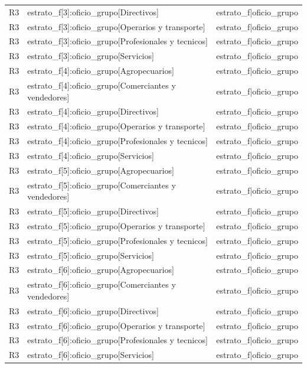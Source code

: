 \begin{longtable}{lll}
R3 & estrato\_f[3]:oficio\_grupo[Directivos] & estrato\_f|oficio\_grupo \\
R3 & estrato\_f[3]:oficio\_grupo[Operarios y transporte] & estrato\_f|oficio\_grupo \\
R3 & estrato\_f[3]:oficio\_grupo[Profesionales y tecnicos] & estrato\_f|oficio\_grupo \\
R3 & estrato\_f[3]:oficio\_grupo[Servicios] & estrato\_f|oficio\_grupo \\
R3 & estrato\_f[4]:oficio\_grupo[Agropecuarios] & estrato\_f|oficio\_grupo \\
R3 & estrato\_f[4]:oficio\_grupo[Comerciantes y vendedores] & estrato\_f|oficio\_grupo \\
R3 & estrato\_f[4]:oficio\_grupo[Directivos] & estrato\_f|oficio\_grupo \\
R3 & estrato\_f[4]:oficio\_grupo[Operarios y transporte] & estrato\_f|oficio\_grupo \\
R3 & estrato\_f[4]:oficio\_grupo[Profesionales y tecnicos] & estrato\_f|oficio\_grupo \\
R3 & estrato\_f[4]:oficio\_grupo[Servicios] & estrato\_f|oficio\_grupo \\
R3 & estrato\_f[5]:oficio\_grupo[Agropecuarios] & estrato\_f|oficio\_grupo \\
R3 & estrato\_f[5]:oficio\_grupo[Comerciantes y vendedores] & estrato\_f|oficio\_grupo \\
R3 & estrato\_f[5]:oficio\_grupo[Directivos] & estrato\_f|oficio\_grupo \\
R3 & estrato\_f[5]:oficio\_grupo[Operarios y transporte] & estrato\_f|oficio\_grupo \\
R3 & estrato\_f[5]:oficio\_grupo[Profesionales y tecnicos] & estrato\_f|oficio\_grupo \\
R3 & estrato\_f[5]:oficio\_grupo[Servicios] & estrato\_f|oficio\_grupo \\
R3 & estrato\_f[6]:oficio\_grupo[Agropecuarios] & estrato\_f|oficio\_grupo \\
R3 & estrato\_f[6]:oficio\_grupo[Comerciantes y vendedores] & estrato\_f|oficio\_grupo \\
R3 & estrato\_f[6]:oficio\_grupo[Directivos] & estrato\_f|oficio\_grupo \\
R3 & estrato\_f[6]:oficio\_grupo[Operarios y transporte] & estrato\_f|oficio\_grupo \\
R3 & estrato\_f[6]:oficio\_grupo[Profesionales y tecnicos] & estrato\_f|oficio\_grupo \\
R3 & estrato\_f[6]:oficio\_grupo[Servicios] & estrato\_f|oficio\_grupo \\

\end{longtable}
